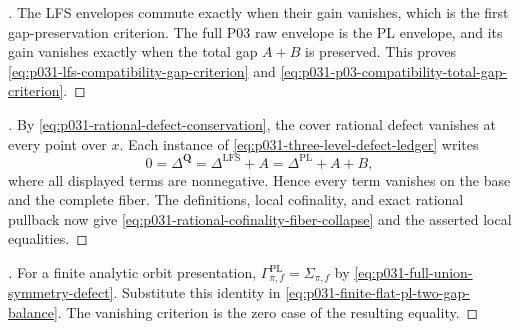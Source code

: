\begin{proof}[]
The LFS envelopes commute exactly when their gain vanishes, which is the
first gap-preservation criterion.  The full P03 raw envelope is the PL
envelope, and its gain vanishes exactly when the total gap $A+B$ is
preserved.  This proves
\eqref{eq:p031-lfs-compatibility-gap-criterion} and
\eqref{eq:p031-p03-compatibility-total-gap-criterion}.
\end{proof}

\begin{proof}[]
By \eqref{eq:p031-rational-defect-conservation}, the cover rational defect
vanishes at every point over $x$.  Each instance of
\eqref{eq:p031-three-level-defect-ledger} writes
\[
       0=\Delta^{\mathbf Q}
          =\Delta^{\mathrm{LFS}}+A
          =\Delta^{\mathrm{PL}}+A+B,
\]
where all displayed terms are nonnegative.  Hence every term vanishes on
the base and the complete fiber.  The definitions, local cofinality, and
exact rational pullback now give
\eqref{eq:p031-rational-cofinality-fiber-collapse} and the asserted local
equalities.
\end{proof}

\begin{proof}[]
For a finite analytic orbit presentation,
$\Gamma^{\mathrm{PL}}_{\pi,f}=\Sigma_{\pi,f}$ by
\eqref{eq:p031-full-union-symmetry-defect}.  Substitute this identity in
\eqref{eq:p031-finite-flat-pl-two-gap-balance}.  The vanishing criterion is
the zero case of the resulting equality.
\end{proof}
